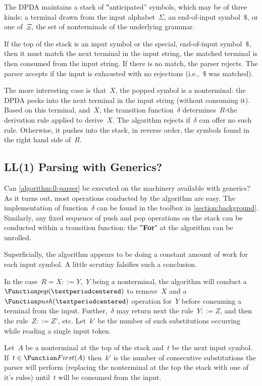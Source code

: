 The DPDA maintains a stack of ‟anticipated” symbols, which may
  be of three kinds: a terminal drawn from the input alphabet~$Σ$,
  an end-of-input symbol~$\$$, or one of~$Ξ$, the set of
  nonterminals of the underlying grammar.

If the top of the stack is an input symbol or the special,
 end-of-input symbol~$\$$, then it must match the next terminal
 in the input string, the matched terminal is then consumed from
 the input string.
If there is no match, the parser rejects.
The parser accepts if the input is exhausted with
  no rejections (i.e.,~$\$$ was matched).

The more interesting case is that~$X$, the popped symbol
  is a nonterminal: the DPDA peeks into the next terminal in the input
  string (without consuming it).
Based on this terminal, and~$X$, the transition function~$δ$
  determines~$R$-the derivation rule applied to derive~$X$.
The algorithm rejects if~$δ$ can offer no such rule.
Otherwise, it pushes into the stack, in reverse order, the symbols
  found in the right hand side of~$R$.

\subsection{LL(1) Parsing with \Java Generics?}
\label{section:limitations}
Can \cref{algorithm:ll-parser} be executed on the machinery
  available with \Java generics?
As it turns out, most operations conducted by the algorithm
  are easy.
The implementation of function~$δ$ can
be found in the toolbox in \cref{section:background}.
Similarly, any fixed sequence of push and pop
  operations on the stack can be conducted within a \Java
  transition function:
  the ‟\textbf{For}" at the algorithm can be unrolled.

Superficially, the algorithm appears to be doing a constant amount
  of work for each input symbol.
A little scrutiny falsifies such a conclusion.

In the case~$R=X::=Y$,~$Y$ %
  being a nonterminal, the algorithm will conduct
  a~$\Function pop(·)$ to remove~$X$ and a~$\Function push(·)$
  operation for~$Y$ before consuming a terminal from the input.
Further,~$δ$ may return next the rule~$Y::=Z$,
  and then the rule~$Z::=Z'$, etc.
Let~$k'$ be the number of such substitutions
  occurring while reading a single input token.

\begin{Definition}
  \label{substitution-factor}
  Let~$A$ be a nonterminal at the top of the stack
    and~$t$ be the next input symbol.
  If~$t \in \Function First(A)$ then~$k'$ is the number of 
  consecutive substitutions the parser will perform 
  (replacing the nonterminal at the top the stack with one of it's rules)
  until~$t$ will be consumed from the input.
\end{Definition}

